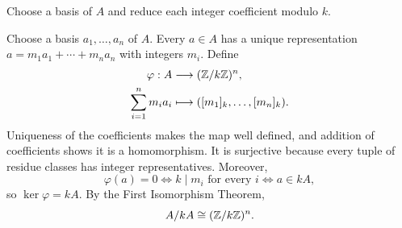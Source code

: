 \documentclass[11pt,oneside]{article}
\begin{document}
\begin{hint}
Choose a basis of $A$ and reduce each integer coefficient modulo $k$.
\end{hint}

\begin{solution}
Choose a basis $a_1,\ldots,a_n$ of $A$. Every $a\in A$ has a unique representation $a=m_1a_1+\cdots+m_na_n$ with integers $m_i$. Define
\[
\begin{aligned}
\varphi:A&\longrightarrow(\mathbb{Z}/k\mathbb{Z})^n,\\
\sum_{i=1}^n m_i a_i&\longmapsto([m_1]_k,\ldots,[m_n]_k).
\end{aligned}
\]
Uniqueness of the coefficients makes the map well defined, and addition of coefficients shows it is a homomorphism. It is surjective because every tuple of residue classes has integer representatives. Moreover,
\[
\varphi(a)=0\iff k\mid m_i\text{ for every }i\iff a\in kA,
\]
so $\ker\varphi=kA$. By the First Isomorphism Theorem,
\[
A/kA\cong(\mathbb{Z}/k\mathbb{Z})^n.
\]
\end{solution}
\end{document}
